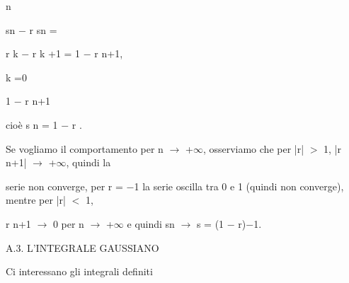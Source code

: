 \documentclass[a4paper,portrait,12pt]{article}
\begin{document}
\begin{flushleft}
n
\end{flushleft}





\begin{flushleft}
sn $-$ r sn =
\end{flushleft}





\begin{flushleft}
r k $-$ r k +1 = 1 $-$ r n+1,
\end{flushleft}





\begin{flushleft}
k =0
\end{flushleft}





\begin{flushleft}
1 $-$ r n+1
\end{flushleft}





\begin{flushleft}
cio\`{e} s n = 1 $-$ r .
\end{flushleft}


\begin{flushleft}
Se vogliamo il comportamento per n $\rightarrow$ +$\infty$, osserviamo che per |r| $>$ 1, |r n+1| $\rightarrow$ +$\infty$, quindi la
\end{flushleft}


\begin{flushleft}
serie non converge, per r = $-$1 la serie oscilla tra 0 e 1 (quindi non converge), mentre per |r| $<$ 1,
\end{flushleft}


\begin{flushleft}
r n+1 $\rightarrow$ 0 per n $\rightarrow$ +$\infty$ e quindi sn $\rightarrow$ s = (1 $-$ r)$-$1.
\end{flushleft}





\begin{flushleft}
A.3. L'INTEGRALE GAUSSIANO
\end{flushleft}


\begin{flushleft}
Ci interessano gli integrali definiti
\end{flushleft}
\end{document}
